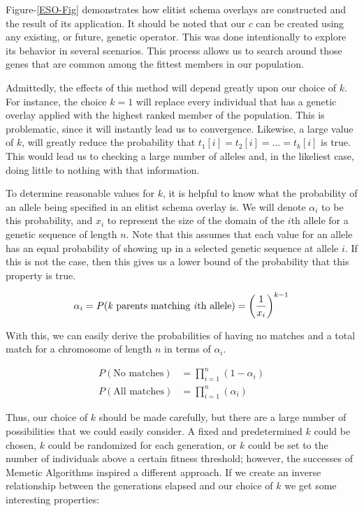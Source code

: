 Figure-\ref{ESO-Fig} demonstrates how elitist schema overlays are constructed and the result of its application. It should be noted that our $c$ can be created using any existing, or future, genetic operator. This was done intentionally to explore its behavior in several scenarios. This process allows us to search around those genes that are common among the fittest members in our population. 

Admittedly, the effects of this method will depend greatly upon our choice of $k$. For instance, the choice $k = 1$ will replace every individual that has a genetic overlay applied with the highest ranked member of the population. This is problematic, since it will instantly lead us to convergence. Likewise, a large value of $k$, will greatly reduce the probability that $t_1[i] = t_2[i] = \ldots = t_k[i]$ is true. This would lead us to checking a large number of alleles and, in the likeliest case, doing little to nothing with that information.

To determine reasonable values for $k$, it is helpful to know what the probability of an allele being specified in an elitist schema overlay is. We will denote $\alpha_i$ to be this probability, and $x_i$ to represent the size of the domain of the $i$th allele for a genetic sequence of length $n$. Note that this assumes that each value for an allele has an equal probability of showing up in a selected genetic sequence at allele $i$. If this is not the case, then this gives us a lower bound of the probability that this property is true.

\[ \alpha_i = P(\text{\emph{k} parents matching \emph{i}th allele}) = \left(\frac{1}{x_i}\right)^{k-1} \]

With this, we can easily derive the probabilities of having no matches and a total match for a chromosome of length $n$ in terms of $\alpha_i$.

\begin{align*}
P( \text{No matches})&= \prod\limits_{i = 1}^n (1 - \alpha_i) \\
P( \text{All matches})&= \prod\limits_{i = 1}^n (\alpha_i)
\end{align*}

Thus, our choice of $k$ should be made carefully, but there are a large number of possibilities that we could easily consider. A fixed and predetermined $k$ could be chosen, $k$ could be randomized for each generation, or $k$ could be set to the number of individuals above a certain fitness threshold; however, the successes of Memetic Algorithms inspired a different approach. If we create an inverse relationship between the generations elapsed and our choice of $k$ we get some interesting properties:

